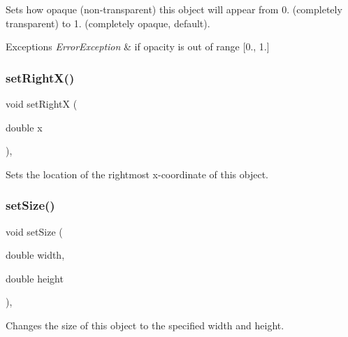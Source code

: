 Sets how opaque (non-\/transparent) this object will appear from 0. (completely transparent) to 1. (completely opaque, default). 


\begin{DoxyExceptions}{Exceptions}
{\em Error\+Exception} & if opacity is out of range \mbox{[}0., 1.\mbox{]} \\
\hline
\end{DoxyExceptions}
\mbox{\label{classsgl_1_1GObject_a3c90b758cdc2c911c9ef76c4360eb912}} 
\subsubsection{\texorpdfstring{set\+Right\+X()}{setRightX()}}
{\footnotesize\ttfamily void set\+RightX (\begin{DoxyParamCaption}\item[{double}]{x }\end{DoxyParamCaption})\hspace{0.3cm}{\ttfamily [virtual]}, {\ttfamily [inherited]}}



Sets the location of the rightmost x-\/coordinate of this object. 

\mbox{\label{classsgl_1_1GObject_aca25d49481f9bf5fc8f7df4c086c4ce7}} 
\subsubsection{\texorpdfstring{set\+Size()}{setSize()}\hspace{0.1cm}{\footnotesize\ttfamily [1/2]}}
{\footnotesize\ttfamily void set\+Size (\begin{DoxyParamCaption}\item[{double}]{width,  }\item[{double}]{height }\end{DoxyParamCaption})\hspace{0.3cm}{\ttfamily [virtual]}, {\ttfamily [inherited]}}



Changes the size of this object to the specified width and height. 


